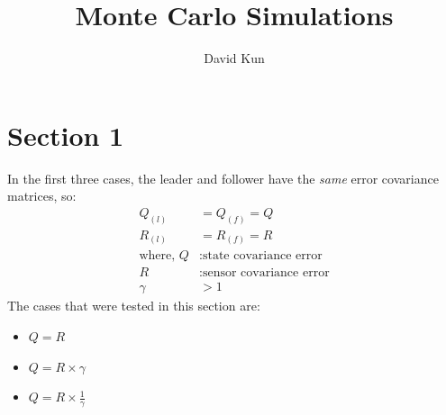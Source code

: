 \documentclass[11pt]{article}
\title{Monte Carlo Simulations}
\author{David Kun}
\begin{document}
\maketitle


\section*{Section 1}
In the first three cases, the leader and follower have the \emph{same} error covariance matrices, so:
\begin{align*}
Q_{(l)} &= Q_{(f)} = Q \\
R_{(l)} &= R_{(f)} = R \\
\text{where, } Q &: \text{state covariance error}\\
 R &: \text{sensor covariance error} \\
 \gamma &>1
\end{align*}
The cases that were tested in this section are:
\begin{itemize}
\item $Q=R$
\item $Q=R \times \gamma$
\item $Q=R \times \frac{1}{\gamma}$
\end{itemize}
\end{document}
